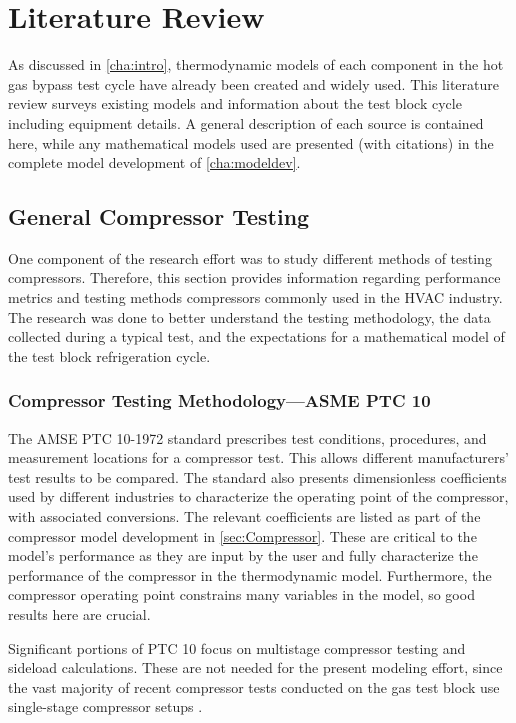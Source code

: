 \chapter{Literature Review} \label{cha:litreview}
As discussed in \cref{cha:intro}, thermodynamic models of each component
in the hot gas bypass test cycle have already been created and widely used.
This literature review surveys existing models and information about the
test block cycle including equipment details. A general description of each
source is contained here, while any mathematical models used are presented
(with citations) in the complete model development of \cref{cha:modeldev}.

\section{General Compressor Testing} \label{sec:gencomp}
One component of the research effort was 
to study different methods of testing compressors. 
Therefore, this section provides information regarding performance metrics 
and testing methods compressors commonly used in the HVAC industry. 
The research was done to better understand the testing methodology, 
the data collected during a typical test, 
and the expectations for a mathematical model of the test block refrigeration cycle.

\subsection{Compressor Testing Methodology---ASME PTC 10} \label{sec:TestMethodology}
The AMSE PTC 10-1972 standard \citep{ptc10} prescribes test conditions, 
procedures, and measurement locations for a compressor test. 
This allows different manufacturers' test results to be compared. 
The standard also presents dimensionless coefficients used by different 
industries to characterize the operating point of the compressor,
with associated conversions. 
The relevant coefficients are listed as part of the 
compressor model development in \cref{sec:Compressor}.
These are critical to the model's performance as they are input
by the user and fully characterize the performance of the compressor
in the thermodynamic model.
Furthermore, the compressor operating point constrains
many variables in the model, so good results here are crucial.

Significant portions of PTC 10 focus on multistage compressor testing
and sideload calculations. These are not needed for the present
modeling effort, since the vast majority of recent compressor tests
conducted on the  gas test block use 
single-stage compressor setups \citep{trevino2012}.

